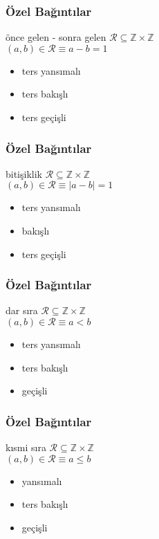 \documentclass[dvipsnames]{beamer}
\theoremstyle{definition}
\theoremstyle{example}
\theoremstyle{plain}
\begin{document}
\begin{frame}
  \frametitle{Özel Bağıntılar}

  \begin{block}{önce gelen - sonra gelen}
    $\mathcal{R} \subseteq \mathbb{Z} \times \mathbb{Z}$\\
    $(a,b) \in \mathcal{R} \equiv a-b=1$

    \medskip
    \begin{itemize}
      \item ters yansımalı
      \item ters bakışlı
      \item ters geçişli
    \end{itemize}
  \end{block}
\end{frame}

\begin{frame}
  \frametitle{Özel Bağıntılar}

  \begin{block}{bitişiklik}
    $\mathcal{R} \subseteq \mathbb{Z} \times \mathbb{Z}$\\
    $(a,b) \in \mathcal{R} \equiv |a-b|=1$

    \medskip
    \begin{itemize}
      \item ters yansımalı
      \item bakışlı
      \item ters geçişli
    \end{itemize}
  \end{block}
\end{frame}

\begin{frame}
  \frametitle{Özel Bağıntılar}

  \begin{block}{dar sıra}
    $\mathcal{R} \subseteq \mathbb{Z} \times \mathbb{Z}$\\
    $(a,b) \in \mathcal{R} \equiv a<b$

    \medskip
    \begin{itemize}
      \item ters yansımalı
      \item ters bakışlı
      \item geçişli
    \end{itemize}
  \end{block}
\end{frame}

\begin{frame}
  \frametitle{Özel Bağıntılar}

  \begin{block}{kısmi sıra}
    $\mathcal{R} \subseteq \mathbb{Z} \times \mathbb{Z}$\\
    $(a,b) \in \mathcal{R} \equiv a \leq b$

    \medskip
    \begin{itemize}
      \item yansımalı
      \item ters bakışlı
      \item geçişli
    \end{itemize}
  \end{block}
\end{frame}
\end{document}
